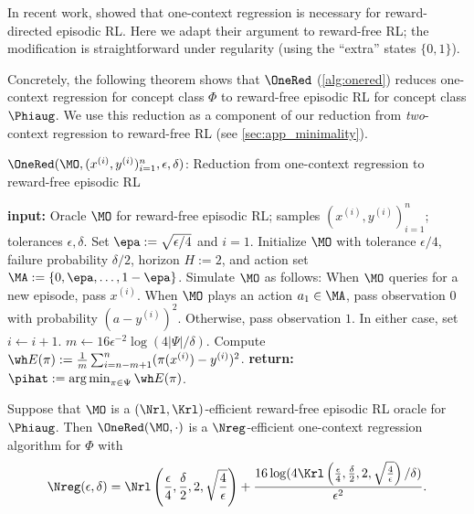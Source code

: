 In recent work, \cite{golowich2024exploration} showed that one-context regression is necessary for reward-directed episodic RL. Here we adapt their argument to reward-free RL; the modification is straightforward under regularity (using the ``extra'' states $\{0,1\}$).

Concretely, the following theorem shows that $\OneRed$ (\cref{alg:onered}) reduces one-context regression for concept class $\Phi$ to reward-free episodic RL for concept class $\Phiaug$. We use this reduction as a component of our reduction from \emph{two}-context regression to reward-free RL (see \cref{sec:app_minimality}).

\begin{algorithm}[t]
	\caption{$\OneRed(\MO, (x^{(i)},y^{(i)})_{i=1}^n,\epsilon,\delta)$: Reduction from one-context regression to reward-free episodic RL}
	\label{alg:onered}
	\begin{algorithmic}[1]\onehalfspacing
		          \State \textbf{input:} Oracle $\MO$ for reward-free episodic RL; samples $(x^{(i)},y^{(i)})_{i=1}^n$; tolerances $\epsilon,\delta$.
		\State Set $\epa := \sqrt{\epsilon/4}$ and $i = 1$. Initialize $\MO$ with tolerance $\epsilon/4$, failure probability $\delta/2$, horizon $H := 2$, and action set $\MA := \{0,\epa,\dots,1-\epa\}$. Simulate $\MO$ as follows:
        \Repeat
            \State When $\MO$ queries for a new episode, pass $x^{(i)}$.
            \State When $\MO$ plays an action $a_1 \in \MA$,  pass observation $0$ with probability $(a-y^{(i)})^2$. Otherwise, pass observation $1$. In either case, set $i \gets i+1$.
        \State $m \gets 16\epsilon^{-2}\log(4|\Psi|/\delta)$.
        \For{$\pi \in \Psi$}
            \State Compute $\wh E(\pi) := \frac{1}{m}\sum_{i=n-m+1}^n (\pi(x^{(i)}) - y^{(i)})^2$.\label{line:one-red-emp}
        \EndFor
        \State \textbf{return:} $\pihat := \argmin_{\pi \in \Psi}  \wh E(\pi)$.
	\end{algorithmic}
\end{algorithm}


\begin{proposition}\label{prop:onered}
Suppose that $\MO$ is a $(\Nrl,\Krl)$-efficient reward-free episodic RL oracle for $\Phiaug$. Then $\OneRed(\MO,\cdot)$ is a $\Nreg$-efficient one-context regression algorithm for $\Phi$ with
\[\Nreg(\epsilon,\delta) = \Nrl\left(\frac{\epsilon}{4}, \frac{\delta}{2}, 2, \sqrt{\frac{4}{\epsilon}}\right) + \frac{16\log(4\Krl\left(\frac{\epsilon}{4}, \frac{\delta}{2}, 2, \sqrt{\frac{4}{\epsilon}}\right)/\delta)}{\epsilon^2}.\]
\end{proposition}

